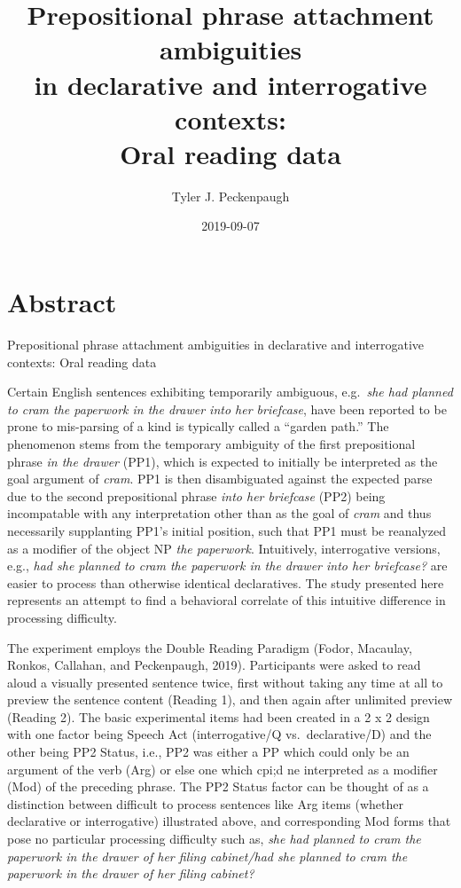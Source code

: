 \documentclass[12pt,oneside]{book}
\title{Prepositional phrase attachment ambiguities\\
in declarative and interrogative contexts:\\
Oral reading data}
\author{Tyler J. Peckenpaugh}
\date{2019-09-07}
\begin{document}
\maketitle

{
\setcounter{tocdepth}{1}
\tableofcontents
}
\listoftables
\listoffigures
\pagebreak

\raggedright

\hypertarget{abstract}{%
\chapter*{Abstract}\label{abstract}}

\hugesize Prepositional phrase attachment ambiguities in declarative and interrogative contexts: Oral reading data

Certain English sentences exhibiting temporarily ambiguous, e.g.~\emph{she had planned to cram the paperwork in the drawer into her briefcase}, have been reported to be prone to mis-parsing of a kind is typically called a ``garden path.'' The phenomenon stems from the temporary ambiguity of the first prepositional phrase \emph{in the drawer} (PP1), which is expected to initially be interpreted as the goal argument of \emph{cram}. PP1 is then disambiguated against the expected parse due to the second prepositional phrase \emph{into her briefcase} (PP2) being incompatable with any interpretation other than as the goal of \emph{cram} and thus necessarily supplanting PP1's initial position, such that PP1 must be reanalyzed as a modifier of the object NP \emph{the paperwork}. Intuitively, interrogative versions, e.g., \emph{had she planned to cram the paperwork in the drawer into her briefcase?} are easier to process than otherwise identical declaratives. The study presented here represents an attempt to find a behavioral correlate of this intuitive difference in processing difficulty.

The experiment employs the Double Reading Paradigm (Fodor, Macaulay, Ronkos, Callahan, and Peckenpaugh, 2019). Participants were asked to read aloud a visually presented sentence twice, first without taking any time at all to preview the sentence content (Reading 1), and then again after unlimited preview (Reading 2). The basic experimental items had been created in a 2 x 2 design with one factor being Speech Act (interrogative/Q vs.~declarative/D) and the other being PP2 Status, i.e., PP2 was either a PP which could only be an argument of the verb (Arg) or else one which cpi;d ne interpreted as a modifier (Mod) of the preceding phrase. The PP2 Status factor can be thought of as a distinction between difficult to process sentences like Arg items (whether declarative or interrogative) illustrated above, and corresponding Mod forms that pose no particular processing difficulty such as, \emph{she had planned to cram the paperwork in the drawer of her filing cabinet/had she planned to cram the paperwork in the drawer of her filing cabinet?}
\end{document}
